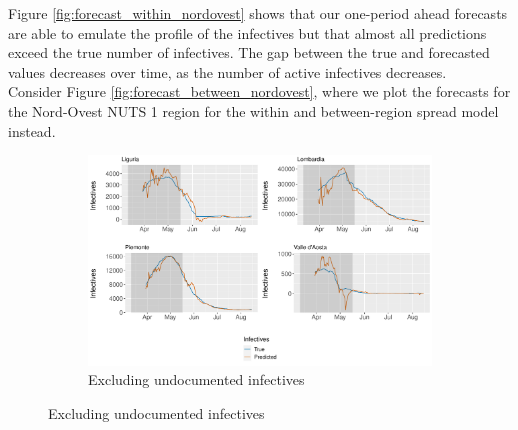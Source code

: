\documentclass[12pt]{article}
\begin{document}
	Figure \ref{fig:forecast_within_nordovest} shows that our one-period ahead forecasts are able to emulate the profile of the infectives but that almost all predictions exceed the true number of infectives. The gap between the true and forecasted values decreases over time, as the number of active infectives decreases.
	\\
	
    Consider Figure \ref{fig:forecast_between_nordovest}, where we plot the forecasts for the Nord-Ovest NUTS 1 region for the within and between-region spread model instead.
	
	\begin{figure}[H]
	    \centering
	    \begin{subfigure}{\textwidth}
	      \centering
	      \includegraphics[width=0.94\linewidth]{output/model_between_lag14_forecast_start20_Nord-Ovest_rolling.pdf}
	      \caption{Excluding undocumented infectives}
	      \label{fig:forecast_between_nordovest_regular}
	    \end{subfigure}
    \end{figure}
\end{document}
